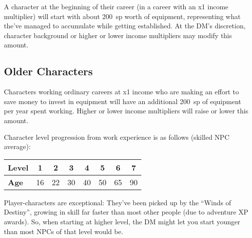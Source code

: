 A character at the beginning of their career (in a career with an x1 income
multiplier) will start with about 200~sp worth of equipment, representing
what the've managed to accumulate while getting established. At the DM's
discretion, character background or higher or lower income multipliers may
modify this amount.


%
\subsection{Older Characters}

Characters working ordinary careers at x1 income who are making an effort
to save money to invest in equipment will have an additional 200~sp of
equipment per year spent working. Higher or lower income multipliers will
raise or lower this amount.


Character level progression from work experience is as follows (skilled NPC
average):

\begin{tabular}{|l||c|c|c|c|c|c|c|}\hline
\textbf{Level} & 1 & 2 & 3 & 4 & 5 & 6 & 7 \\ \hline
\textbf{Age} & 16 & 22 & 30 & 40 & 50 & 65 & 90 \\ \hline
\end{tabular}

Player-characters are exceptional: They've been picked up by the ``Winds
of Destiny'', growing in skill far faster than most other people (due to
adventure XP awards). So, when starting at higher level, the DM might let
you start younger than most NPCs of that level would be.

%

